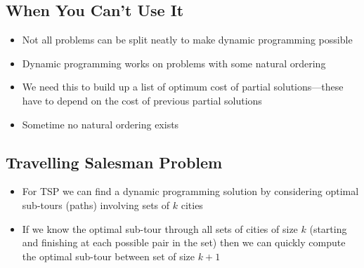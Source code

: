 \begin{slide}
\section{When You Can't Use It}

\begin{PauseHighLight}
  \begin{itemize}
  \item Not all problems can be split neatly to make dynamic programming
    possible\pause
  \item Dynamic programming works on problems with some natural
    ordering\pause 
  \item We need this to build up a list of optimum cost of partial
    solutions---these have to depend on the cost of previous partial
    solutions\pause
  \item Sometime no natural ordering exists\pause
  \end{itemize}
\end{PauseHighLight}

\end{slide}


\begin{slide}
\section[-2]{Travelling Salesman Problem}

\pb
\begin{itemize}
\item For TSP we can find a dynamic programming solution by
  considering optimal sub-tours (paths) involving sets of $k$
  cities\pauseh
\item If we know the optimal sub-tour through all sets of cities of
  size $k$ (starting and finishing at each possible pair in the set)
  then we can quickly compute the optimal sub-tour between set of size
  $k+1$\pauseh
  \begin{center}
    \pause  
  \end{center}
\end{itemize}



\end{slide}


